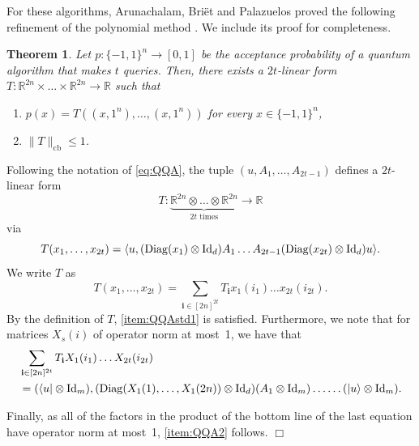 \documentclass[11pt]{article}
\DeclareMathOperator{\cb}{cb}
\newcommand{\norm}[1]{\|#1\|}
\newcommand{\R}{\mathbb{R}} %
\newcommand{\1}{\mathbf{1}}
\newcommand{\Id}{\ensuremath{\mathop{\rm Id}\nolimits}}
\DeclareMathOperator{\Diag}{Diag}
\newcommand{\ind}[1]{\mathbf{#1}}
\theoremstyle{plain}
\newtheorem{theorem}{Theorem}[section]
\theoremstyle{definition}
\theoremstyle{remark}
\renewenvironment{proof}[1][]{
    	\begin{trivlist}
     	\item[\hspace{\labelsep}{\em\noindent Proof#1:\/}]}
     	{{\hfill$\Box$}
    	\end{trivlist}
  }
\begin{document}
For these algorithms, Arunachalam, Briët and Palazuelos proved the following refinement of the polynomial method \cite{QQA=CBF}. We include its proof for completeness. 
\begin{theorem}\label{theo:cbmethodstd}
    Let $p:\{-1,1\}^n\to [0,1]$ be the acceptance probability of a quantum algorithm that makes $t$ queries. Then, there exists a $2t$-linear form $T:\mathbb R^{2n}\times\dots\times\R^{2n}\to \R$ such that 
    \begin{enumerate}
        \item $p(x)=T((x,1^n), \dots,(x,1^n))$  for every $x\in\{-1,1\}^n$, \label{item:QQAstd1}
        \item $\norm{T}_{\cb}\leq 1$. \label{item:QQA2}
    \end{enumerate}
\end{theorem}
\begin{proof}
        Following the notation of \cref{eq:QQA}, the tuple $(u,A_1,\dots,A_{2t-1})$ defines a $2t$-linear form 
        $$T:\underbrace{\mathbb R^{2n}\otimes\dots\otimes \mathbb R^{2n}}_{2t \text{ times}}\to \mathbb R$$ via 
    \begin{equation*}
        T(x_1,\dots,x_{2t})=\langle u,(\Diag(x_1)\otimes \Id_d)A_{1}\dots A_{2t-1} (\Diag(x_{2t})\otimes \Id_d)u\rangle.
    \end{equation*}
   We write $T$ as
    \begin{equation*}
        T(x_1,\dots,x_{2t})=\sum_{\ind i\in [2n]^{2t}}T_{\ind i}x_1(i_1)\dots x_{2t}(i_{2t}).
    \end{equation*}
        By the definition of $T$, \cref{item:QQAstd1} is satisfied. Furthermore, we note that for matrices $X_s(i)$ of operator norm at most~1, we have that 
        \begin{align*}
            &\sum_{\ind i\in [2n]^{2t}}T_{\ind i}X_1(i_1)\dots X_{2t}(i_{2t})\\
            &=(\langle u|\otimes \Id_m ), (\Diag(X_1(1),\dots,X_1(2n))\otimes \Id_d)(A_1 \otimes \Id _m) \dots\dots (|u\rangle\otimes \Id_m).
        \end{align*}

        Finally, as all of the factors in the product of the bottom line of the last equation have operator norm at most~1, \cref{item:QQA2} follows.
    \end{proof}
\end{document}
